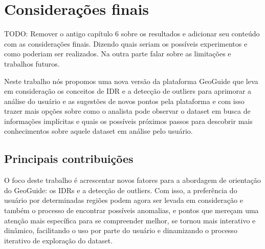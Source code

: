 \chapter{Considerações finais}

TODO: Remover o antigo capítulo 6 sobre os resultados e adicionar seu conteúdo com as considerações finais. Dizendo quais seriam os possíveis experimentos e como poderiam ser realizados. Na outra parte falar sobre as limitações e trabalhos futuros.


Neste trabalho nós propomos uma nova versão da plataforma GeoGuide \cite{omidvarTehrani2017} que leva em consideração os conceitos de IDR e a detecção de outliers para aprimorar a análise do usuário e as sugestões de novos pontos pela plataforma e com isso trazer mais opções sobre como o analista pode observar o dataset em busca de informações implícitas e quais os possíveis próximos passos para descobrir mais conhecimentos sobre aquele dataset em análise pelo usuário.

\section{Principais contribuições}

O foco deste trabalho é acrescentar novos fatores para a abordagem de orientação do GeoGuide: os IDRs e a detecção de outliers. Com isso, a preferência do usuário por determinadas regiões podem agora ser levada em consideração e também o processo de encontrar possíveis anomalias, e pontos que mereçam uma atenção mais específica para se compreender melhor, se tornou mais interativo e dinâmico, facilitando o uso por parte do usuário e dinamizando o processo iterativo de exploração do dataset.

